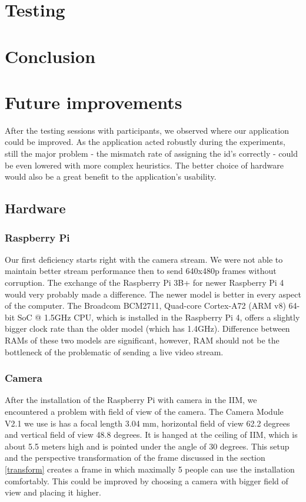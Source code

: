 \documentclass{ctuthesis}
\begin{document}
\chapter{Testing}

\chapter{Conclusion}

\chapter{Future improvements}
After the testing sessions with participants, we observed where our application could be improved. As the application acted robustly during the experiments, still the major problem - the mismatch rate of assigning the id's correctly - could be even lowered with more complex heuristics. The better choice of hardware would also be a great benefit to the application's usability.

\section{Hardware}
\subsection{Raspberry Pi}
Our first deficiency starts right with the camera stream. We were not able to maintain better stream performance then to send 640x480p frames without corruption. The exchange of the Raspberry Pi 3B+ for newer Raspberry Pi 4 would very probably made a difference. The newer model is better in every aspect of the computer. The Broadcom BCM2711, Quad-core Cortex-A72 (ARM v8) 64-bit SoC @ 1.5GHz CPU, which is installed in the Raspberry Pi 4, offers a slightly bigger clock rate than the older model (which has 1.4GHz)\cite{88}. Difference between RAMs of these two models are significant, however, RAM should not be the bottleneck of the problematic of sending a live video stream.

\subsection{Camera}
After the installation of the Raspberry Pi with camera in the IIM, we encountered a problem with field of view of the camera. The Camera Module V2.1 we use is has a focal length 3.04 mm, horizontal field of view 62.2 degrees and vertical field of view 48.8 degrees. It is hanged at the ceiling of IIM, which is about 5.5 meters high and is pointed under the angle of 30 degrees. This setup and the perspective transformation of the frame discussed in the section \ref{transform} creates a frame in which maximally 5 people can use the installation comfortably. This could be improved by choosing a camera with bigger field of view and placing it higher.
\end{document}
